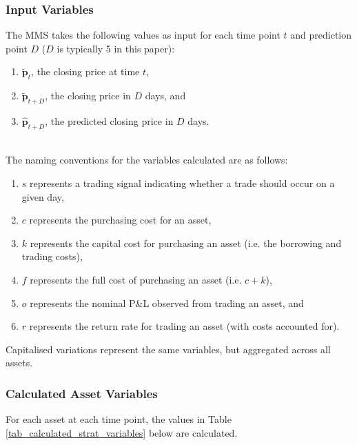 \documentclass[a4paper,11pt,oneside]{article}
\theoremstyle{plain}
\theoremstyle{definition}
\begin{document}
	\subsubsection{Input Variables}
	
	The MMS takes the following values as input for each time point $t$  and prediction point $D$ ($D$ is typically 5 in this paper):
	\begin{enumerate}
		\item {$\mathbf{\tilde{p}}_t$}, the closing price at time $t$, 
		\item $\mathbf{\tilde{p}}_{t+D}$, the closing price in $D$ days, and
		\item $\hat{\mathbf{p}}_{t+D}$, the predicted closing price in $D$ days.
	\end{enumerate}

	~\\The naming conventions for the variables calculated are as follows:
	
		\begin{enumerate}
		\item $s$ represents a trading signal indicating whether a trade should occur on a given day, 
		\item $c$ represents the purchasing cost for an asset, 
		\item $k$ represents the capital cost for purchasing an asset (i.e. the borrowing and trading costs), 
		\item $f$ represents the full cost of purchasing an asset (i.e. $c +k$), 
		\item $o$ represents the nominal P\&L observed from trading an asset, and
		\item $r$ represents the return rate  for trading an asset (with costs accounted for).
	\end{enumerate}
	
	Capitalised variations represent the same variables, but aggregated across all assets.
	
	\subsubsection{Calculated Asset Variables}
	
	For each asset at each time point, the values in Table \ref{tab_calculated_strat_variables} below are calculated. 
	
\end{document}
